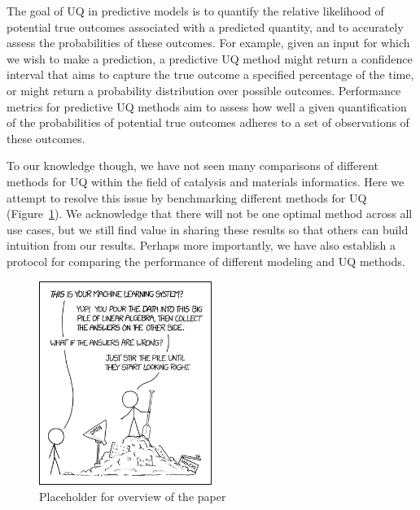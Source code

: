 \documentclass[]{achemso}
\begin{document}
The goal of \gls{UQ} in predictive models is to quantify the relative
likelihood of potential true outcomes associated with a predicted quantity, and
to accurately assess the probabilities of these outcomes. For example, given an
input for which we wish to make a prediction, a predictive \gls{UQ} method
might return a confidence interval that aims to capture the true outcome a
specified percentage of the time, or might return a probability distribution
over possible outcomes. Performance metrics for predictive \gls{UQ} methods aim
to assess how well a given quantification of the probabilities of potential
true outcomes adheres to a set of observations of these outcomes. 

To our knowledge though, we have not seen many comparisons of different methods for \gls{UQ} within the field of catalysis and materials informatics.
Here we attempt to resolve this issue by benchmarking different methods for \gls{UQ} (Figure~\ref{fig:overview}).
We acknowledge that there will not be one optimal method across all use cases, but we still find value in sharing these results so that others can build intuition from our results.
Perhaps more importantly, we have also establish a protocol for comparing the performance of different modeling and \gls{UQ} methods.

\begin{figure}
    \centering
    \includegraphics[width=0.5\textwidth]{placeholder.png}
    \caption{Placeholder for overview of the paper}\label{fig:overview}
\end{figure}
\end{document}
